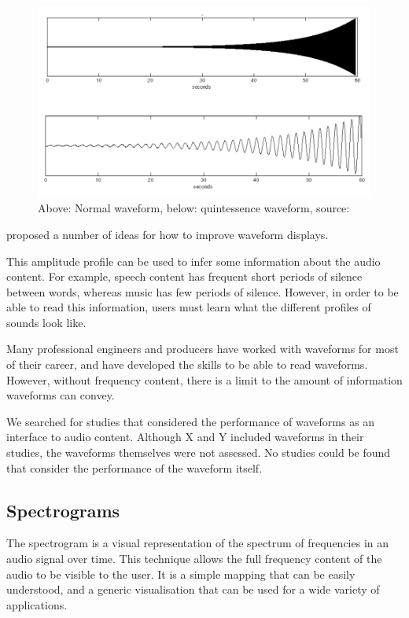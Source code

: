 \begin{figure}[p]
  \centering
  \includegraphics[width=0.95\linewidth]{figs/quint.png}
  \caption{Above: Normal waveform, below: quintessence waveform, source: \citep{Loviscach2011}}
  \label{fig:quint}
\end{figure}

\citet{Gohlke2010} proposed a number of ideas for how to improve waveform displays.

This amplitude profile can be used to infer some information about the audio content. For example, speech content has
frequent short periods of silence between words, whereas music has few periods of silence. However, in order to be able
to read this information, users must learn what the different profiles of sounds look like.

Many professional engineers and producers have worked with waveforms for most of their career, and have developed the
skills to be able to read waveforms.  However, without frequency content, there is a limit to the amount of information
waveforms can convey.

We searched for studies that considered the performance of waveforms as an interface to audio content. Although X and Y
included waveforms in their studies, the waveforms themselves were not assessed. No studies could be found that
consider the performance of the waveform itself.

\subsection{Spectrograms}
The spectrogram is a visual representation of the spectrum of frequencies in an audio signal over time.  This technique
allows the full frequency content of the audio to be visible to the user. It is a simple mapping that can be easily
understood, and a generic visualisation that can be used for a wide variety of applications.

